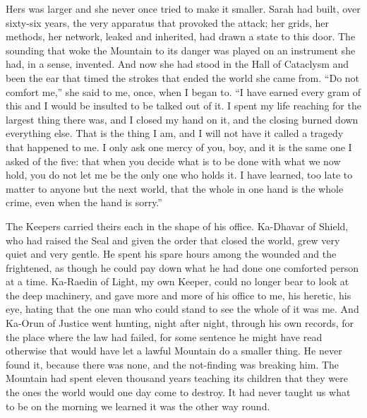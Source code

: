 Hers was larger and she never once tried to make it smaller. Sarah had built, over sixty-six years, the very apparatus that provoked the attack; her grids, her methods, her network, leaked and inherited, had drawn a state to this door. The sounding that woke the Mountain to its danger was played on an instrument she had, in a sense, invented. And now she had stood in the Hall of Cataclysm and been the ear that timed the strokes that ended the world she came from. ``Do not comfort me,'' she said to me, once, when I began to. ``I have earned every gram of this and I would be insulted to be talked out of it. I spent my life reaching for the largest thing there was, and I closed my hand on it, and the closing burned down everything else. That is the thing I am, and I will not have it called a tragedy that happened to me. I only ask one mercy of you, boy, and it is the same one I asked of the five: that when you decide what is to be done with what we now hold, you do not let me be the only one who holds it. I have learned, too late to matter to anyone but the next world, that the whole in one hand is the whole crime, even when the hand is sorry.''\par

The Keepers carried theirs each in the shape of his office. Ka-Dhavar of Shield, who had raised the Seal and given the order that closed the world, grew very quiet and very gentle. He spent his spare hours among the wounded and the frightened, as though he could pay down what he had done one comforted person at a time. Ka-Raedin of Light, my own Keeper, could no longer bear to look at the deep machinery, and gave more and more of his office to me, his heretic, his eye, hating that the one man who could stand to see the whole of it was me. And Ka-Orun of Justice went hunting, night after night, through his own records, for the place where the law had failed, for some sentence he might have read otherwise that would have let a lawful Mountain do a smaller thing. He never found it, because there was none, and the not-finding was breaking him. The Mountain had spent eleven thousand years teaching its children that they were the ones the world would one day come to destroy. It had never taught us what to be on the morning we learned it was the other way round.\par

